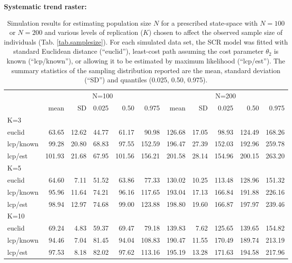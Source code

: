 \begin{table}[h!]
\label{tab.results1}
{\small
\caption{Simulation results for estimating population size $N$ for a prescribed state-space with
$N=100$ or $N=200$ and various levels of replication ($K$) chosen to affect the observed sample
size of individuals (Tab. \ref{tab.samplesize}). For each simulated data set, the SCR model was fitted with
standard Euclidean distance (``euclid''), least-cost path assuming the
cost parameter $\theta_2$ is known (``lcp/known''), or allowing it to
be estimated by maximum likelihood (``lcp/est'').
The summary statistics of the
sampling distribution reported are the mean, standard deviation
(``SD'') and quantiles (0.025, 0.50, 0.975).
}
{\bf Systematic trend raster:} \\
\begin{tabular}{l|rrrrr|rrrrr}
         & \multicolumn{5}{c}{N=100   } & \multicolumn{5}{c}{N=200  }  \\
         &   mean &  SD  & 0.025 & 0.50 & 0.975  & mean  & SD   & 0.025 & 0.50  & 0.975 \\ \hline
K=3      &        &      &       &      &        &       &      &       &       &       \\
euclid   &   63.65& 12.62& 44.77 & 61.17&  90.98 & 126.68& 17.05&  98.93& 124.49& 168.26 \\
lcp/known&   99.28& 20.80& 68.83 & 97.55& 152.59 & 196.47& 27.39& 152.03& 192.96& 259.78\\
lcp/est  &  101.93& 21.68& 67.95 &101.56& 156.21 & 201.58& 28.14& 154.96& 200.15& 263.20\\
K=5      &        &      &       &      &        &       &      &       &       &        \\
euclid   &  64.60 & 7.11 & 51.52 & 63.86&  77.33 & 130.02& 10.25& 113.48& 128.96& 151.32\\
lcp/known&  95.96 &11.64 & 74.21 & 96.16& 117.65 & 193.04& 17.13& 166.84& 191.88& 226.16\\
lcp/est  &  98.94 &12.97 & 74.68 & 99.00& 123.88 & 198.80& 19.60& 166.87& 197.97& 239.46\\
K=10     &        &      &       &      &        &       &      &       &       &       \\
euclid   &  69.24 & 4.83 & 59.37 & 69.47&  79.18 & 139.83&  7.62& 125.65& 139.65& 154.82\\
lcp/known&  94.46 & 7.04 & 81.45 & 94.04& 108.83 & 190.47& 11.55& 170.49& 189.74& 213.19\\
lcp/est  &  97.53 & 8.18 & 82.02 & 97.62& 113.16 & 195.19& 13.28& 171.63& 194.58& 217.96\\ \hline

\end{tabular}}
\end{table}
